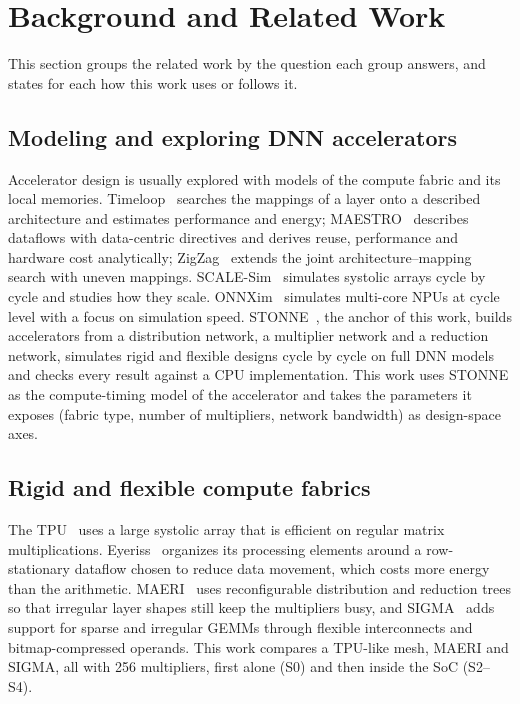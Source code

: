\documentclass[conference]{IEEEtran}
\begin{document}
\section{Background and Related Work}
This section groups the related work by the question each group answers, and states for each how this work uses or follows it.

\subsection{Modeling and exploring DNN accelerators}
Accelerator design is usually explored with models of the compute fabric and its local memories. Timeloop~\cite{timeloop} searches the mappings of a layer onto a described architecture and estimates performance and energy; MAESTRO~\cite{maestro} describes dataflows with data-centric directives and derives reuse, performance and hardware cost analytically; ZigZag~\cite{zigzag} extends the joint architecture--mapping search with uneven mappings. SCALE-Sim~\cite{scalesim} simulates systolic arrays cycle by cycle and studies how they scale. ONNXim~\cite{onnxim} simulates multi-core NPUs at cycle level with a focus on simulation speed. STONNE~\cite{stonne_cal,stonne_iiswc}, the anchor of this work, builds accelerators from a distribution network, a multiplier network and a reduction network, simulates rigid and flexible designs cycle by cycle on full DNN models and checks every result against a CPU implementation. This work uses STONNE as the compute-timing model of the accelerator and takes the parameters it exposes (fabric type, number of multipliers, network bandwidth) as design-space axes.

\subsection{Rigid and flexible compute fabrics}
The TPU~\cite{tpu} uses a large systolic array that is efficient on regular matrix multiplications. Eyeriss~\cite{eyeriss} organizes its processing elements around a row-stationary dataflow chosen to reduce data movement, which costs more energy than the arithmetic. MAERI~\cite{maeri} uses reconfigurable distribution and reduction trees so that irregular layer shapes still keep the multipliers busy, and SIGMA~\cite{sigma} adds support for sparse and irregular GEMMs through flexible interconnects and bitmap-compressed operands. This work compares a TPU-like mesh, MAERI and SIGMA, all with 256 multipliers, first alone (S0) and then inside the SoC (S2--S4).
\end{document}
